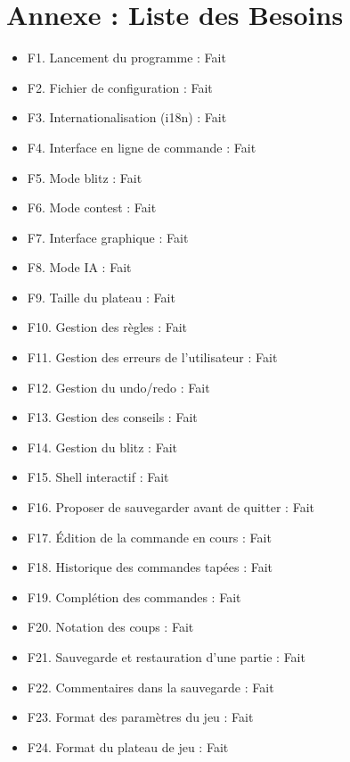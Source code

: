 \documentclass[a4paper]{article}
\begin{document}
\nocite{*}



\newpage
\appendix

\section{Annexe : Liste des Besoins}
\begin{itemize}
    \item F1. Lancement du programme : Fait
    \item F2. Fichier de configuration : Fait
    \item F3. Internationalisation (i18n) : Fait
    \item F4. Interface en ligne de commande : Fait
    \item F5. Mode blitz : Fait
    \item F6. Mode contest : Fait
    \item F7. Interface graphique : Fait
    \item F8. Mode IA : Fait
    \item F9. Taille du plateau : Fait
    \item F10. Gestion des règles : Fait
    \item F11. Gestion des erreurs de l'utilisateur : Fait
    \item F12. Gestion du undo/redo : Fait
    \item F13. Gestion des conseils : Fait
    \item F14. Gestion du blitz : Fait
    \item F15. Shell interactif : Fait
    \item F16. Proposer de sauvegarder avant de quitter : Fait
    \item F17. Édition de la commande en cours : Fait
    \item F18. Historique des commandes tapées : Fait
    \item F19. Complétion des commandes : Fait
    \item F20. Notation des coups : Fait
    \item F21. Sauvegarde et restauration d'une partie : Fait
    \item F22. Commentaires dans la sauvegarde : Fait
    \item F23. Format des paramètres du jeu : Fait
    \item F24. Format du plateau de jeu : Fait

\end{itemize}
\end{document}
